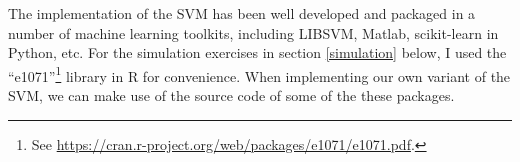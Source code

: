 \documentclass[12pt]{article}
\theoremstyle{definition}
\begin{document}
The implementation of the SVM has been well developed and packaged in a number of machine learning toolkits, including LIBSVM, Matlab, scikit-learn in Python, etc. For the simulation exercises in section \ref{simulation} below, I used the ``e1071''\footnote{See \href{https://cran.r-project.org/web/packages/e1071/e1071.pdf}{https://cran.r-project.org/web/packages/e1071/e1071.pdf}.} library in R for convenience. When implementing our own variant of the SVM, we can make use of the source code of some of the these packages. 



\end{document}
